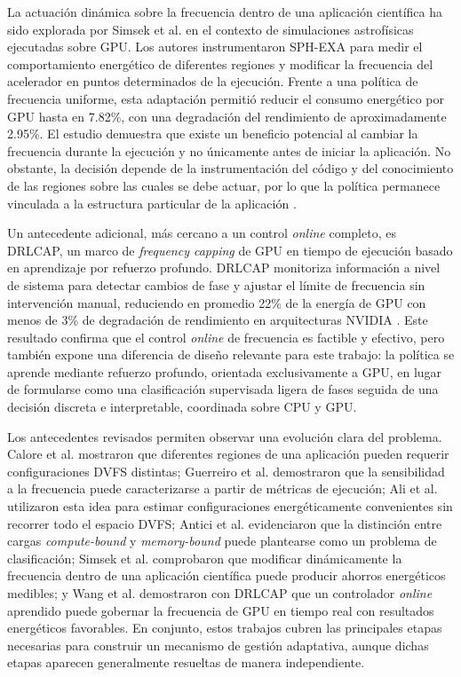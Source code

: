 La actuación dinámica sobre la frecuencia dentro de una aplicación científica ha sido explorada por Simsek et al. \cite{Simsek2024} en el contexto de simulaciones astrofísicas ejecutadas sobre GPU. Los autores instrumentaron SPH-EXA para medir el comportamiento energético de diferentes regiones y modificar la frecuencia del acelerador en puntos determinados de la ejecución. Frente a una política de frecuencia uniforme, esta adaptación permitió reducir el consumo energético por GPU hasta en 7.82\%, con una degradación del rendimiento de aproximadamente 2.95\%. El estudio demuestra que existe un beneficio potencial al cambiar la frecuencia durante la ejecución y no únicamente antes de iniciar la aplicación. No obstante, la decisión depende de la instrumentación del código y del conocimiento de las regiones sobre las cuales se debe actuar, por lo que la política permanece vinculada a la estructura particular de la aplicación \cite{Simsek2024}.

Un antecedente adicional, más cercano a un control \textit{online} completo, es DRLCAP, un marco de \textit{frequency capping} de GPU en tiempo de ejecución basado en aprendizaje por refuerzo profundo. DRLCAP monitoriza información a nivel de sistema para detectar cambios de fase y ajustar el límite de frecuencia sin intervención manual, reduciendo en promedio 22\% de la energía de GPU con menos de 3\% de degradación de rendimiento en arquitecturas NVIDIA \cite{Wang2024}. Este resultado confirma que el control \textit{online} de frecuencia es factible y efectivo, pero también expone una diferencia de diseño relevante para este trabajo: la política se aprende mediante refuerzo profundo, orientada exclusivamente a GPU, en lugar de formularse como una clasificación supervisada ligera de fases seguida de una decisión discreta e interpretable, coordinada sobre CPU y GPU.

Los antecedentes revisados permiten observar una evolución clara del problema. Calore et al. \cite{Calore2017} mostraron que diferentes regiones de una aplicación pueden requerir configuraciones DVFS distintas; Guerreiro et al. \cite{Guerreiro2019} demostraron que la sensibilidad a la frecuencia puede caracterizarse a partir de métricas de ejecución; Ali et al. \cite{Ali2023} utilizaron esta idea para estimar configuraciones energéticamente convenientes sin recorrer todo el espacio DVFS; Antici et al. \cite{Antici2024} evidenciaron que la distinción entre cargas \textit{compute-bound} y \textit{memory-bound} puede plantearse como un problema de clasificación; Simsek et al. \cite{Simsek2024} comprobaron que modificar dinámicamente la frecuencia dentro de una aplicación científica puede producir ahorros energéticos medibles; y Wang et al. \cite{Wang2024} demostraron con DRLCAP que un controlador \textit{online} aprendido puede gobernar la frecuencia de GPU en tiempo real con resultados energéticos favorables. En conjunto, estos trabajos cubren las principales etapas necesarias para construir un mecanismo de gestión adaptativa, aunque dichas etapas aparecen generalmente resueltas de manera independiente.

